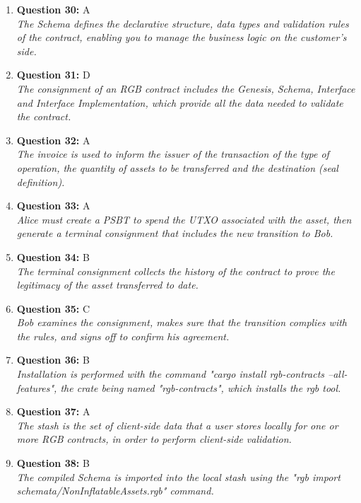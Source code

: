 \documentclass[12pt,a4paper]{article}
\begin{document}
\begin{enumerate}
\item \textbf{Question 30:} A
\\ \textit{The Schema defines the declarative structure, data types and validation rules of the contract, enabling you to manage the business logic on the customer's side.}

\item \textbf{Question 31:} D
\\ \textit{The consignment of an RGB contract includes the Genesis, Schema, Interface and Interface Implementation, which provide all the data needed to validate the contract.}

\item \textbf{Question 32:} A
\\ \textit{The invoice is used to inform the issuer of the transaction of the type of operation, the quantity of assets to be transferred and the destination (seal definition).}

\item \textbf{Question 33:} A
\\ \textit{Alice must create a PSBT to spend the UTXO associated with the asset, then generate a terminal consignment that includes the new transition to Bob.}

\item \textbf{Question 34:} B
\\ \textit{The terminal consignment collects the history of the contract to prove the legitimacy of the asset transferred to date.}

\item \textbf{Question 35:} C
\\ \textit{Bob examines the consignment, makes sure that the transition complies with the rules, and signs off to confirm his agreement.}

\item \textbf{Question 36:} B
\\ \textit{Installation is performed with the command "cargo install rgb-contracts --all-features", the crate being named "rgb-contracts", which installs the rgb tool.}

\item \textbf{Question 37:} A
\\ \textit{The stash is the set of client-side data that a user stores locally for one or more RGB contracts, in order to perform client-side validation.}

\item \textbf{Question 38:} B
\\ \textit{The compiled Schema is imported into the local stash using the "rgb import schemata/NonInflatableAssets.rgb" command.}


\end{enumerate}
\end{document}
